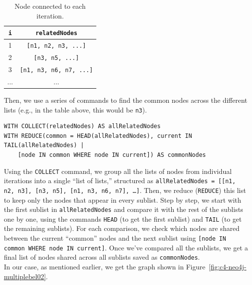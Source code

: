 \begin{table}[!h]
    \centering
    \begin{tabular}{|c|c|}
    \hline
        \textbf{\texttt{i}}  & \textbf{\texttt{relatedNodes}} \\ \hline
         1          & \texttt{[n1, n2, n3, ...]} \\ \hline
         2          & \texttt{[n3, n5, ...]} \\ \hline
         3          & \texttt{[n1, n3, n6, n7, ...]} \\ \hline
         ...          & ... \\ \hline
    \end{tabular}
    \caption{Node connected to each iteration.}
    \label{tab:c4-neo4jtable01}
\end{table}

Then, we use a series of commands to find the common nodes across the different lists (e.g., in the table above, this would be \texttt{n3}).
\begin{lstlisting}[style=cypher]
WITH COLLECT(relatedNodes) AS allRelatedNodes
WITH REDUCE(common = HEAD(allRelatedNodes), current IN TAIL(allRelatedNodes) |
    [node IN common WHERE node IN current]) AS commonNodes
\end{lstlisting}
Using the \texttt{COLLECT} command, we group all the lists of nodes from individual iterations into a single ``list of lists,'' structured as \texttt{allRelatedNodes = [[n1, n2, n3], [n3, n5], [n1, n3, n6, n7], …]}. Then, we reduce (\texttt{REDUCE}) this list to keep only the nodes that appear in every sublist. Step by step, we start with the first sublist in \texttt{allRelatedNodes} and compare it with the rest of the sublists one by one, using the commands \texttt{HEAD} (to get the first sublist) and \texttt{TAIL} (to get the remaining sublists). For each comparison, we check which nodes are shared between the current ``common'' nodes and the next sublist using \texttt{[node IN common WHERE node IN current]}. Once we’ve compared all the sublists, we get a final list of nodes shared across all sublists saved as \texttt{commonNodes}.\\
In our case, as mentioned earlier, we get the graph shown in Figure~\ref{fig:c4-neo4j-multiplebel02}.

